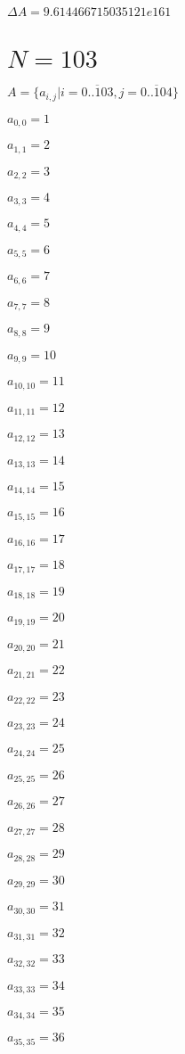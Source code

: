 \documentclass[a4paper,12pt]{article}
\begin{document}
$\Delta A = 9.614466715035121e161$



\section{ $N = 103$ }
$A = \{ a _{ i, j } | i = \overline { 0..103 }, j = \overline { 0..104 } \}$

$a _{ 0, 0 } = 1$

$a _{ 1, 1 } = 2$

$a _{ 2, 2 } = 3$

$a _{ 3, 3 } = 4$

$a _{ 4, 4 } = 5$

$a _{ 5, 5 } = 6$

$a _{ 6, 6 } = 7$

$a _{ 7, 7 } = 8$

$a _{ 8, 8 } = 9$

$a _{ 9, 9 } = 10$

$a _{ 10, 10 } = 11$

$a _{ 11, 11 } = 12$

$a _{ 12, 12 } = 13$

$a _{ 13, 13 } = 14$

$a _{ 14, 14 } = 15$

$a _{ 15, 15 } = 16$

$a _{ 16, 16 } = 17$

$a _{ 17, 17 } = 18$

$a _{ 18, 18 } = 19$

$a _{ 19, 19 } = 20$

$a _{ 20, 20 } = 21$

$a _{ 21, 21 } = 22$

$a _{ 22, 22 } = 23$

$a _{ 23, 23 } = 24$

$a _{ 24, 24 } = 25$

$a _{ 25, 25 } = 26$

$a _{ 26, 26 } = 27$

$a _{ 27, 27 } = 28$

$a _{ 28, 28 } = 29$

$a _{ 29, 29 } = 30$

$a _{ 30, 30 } = 31$

$a _{ 31, 31 } = 32$

$a _{ 32, 32 } = 33$

$a _{ 33, 33 } = 34$

$a _{ 34, 34 } = 35$

$a _{ 35, 35 } = 36$
\end{document}
